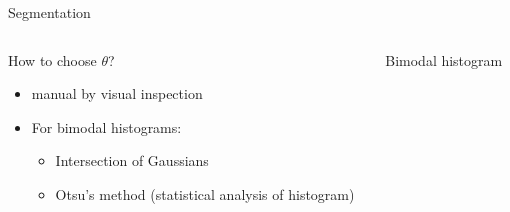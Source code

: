 \begin{frame}[c]{Segmentation}
    \begin{columns}[onlytextwidth,T]
        \begin{column}{0.475\textwidth}
            \begin{block}{How to choose $\theta$?}
                \begin{itemize}
                    \item manual by visual inspection
                    \item For bimodal histograms:
                          \begin{itemize}
                              \item Intersection of Gaussians
                              \item Otsu's method (statistical analysis of histogram)
                          \end{itemize}
                \end{itemize}
            \end{block}
        \end{column}
        \begin{column}{0.475\textwidth}
            \centering
            Bimodal histogram
        \end{column}
    \end{columns}
\end{frame}

